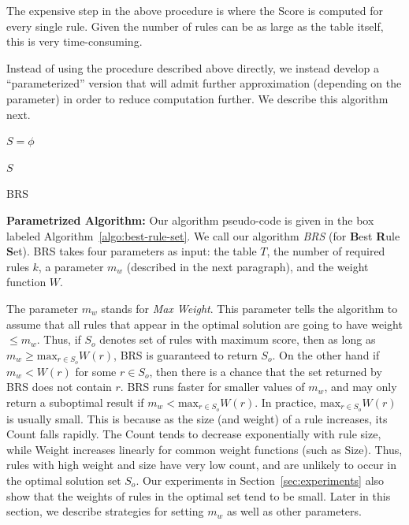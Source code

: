 \documentclass[10pt,journal,compsoc]{IEEEtran}
\newcommand{\stitle}[1]{\vspace{0.5em}\noindent\textbf{#1}}
\newcommand{\papertext}[1]{}
\newcommand{\techreporttext}[1]{#1}
\begin{document}
The expensive step in the above procedure is where the Score is computed for every
single rule. Given the number of rules can be as large as the table itself, this is very time-consuming.

Instead of using the procedure described above directly, we instead develop a ``parameterized'' version 
that will admit further approximation (depending on the parameter) in order to reduce computation further. We describe
this algorithm next.

\begin{algorithm}
\scriptsize
{}
$S = \phi$ 

\Return $S$
\caption{BRS\label{algo:best-rule-set}}
\end{algorithm}

\stitle{Parametrized Algorithm:} Our algorithm pseudo-code is given in the box labeled Algorithm~\ref{algo:best-rule-set}. We call our algorithm {\em BRS} (for \textbf{B}est \textbf{R}ule \textbf{S}et). BRS takes four parameters as input: the table $T$, the number of required rules $k$, a parameter $m_w$ (described in the next paragraph), and the weight function $W$. 

The parameter $m_w$ stands for \textit{Max Weight}. This parameter tells the algorithm to assume that all rules that appear in the optimal solution are going to have weight $\leq m_w$. Thus, if $S_o$ denotes set of rules with maximum score, then as long as $m_w \geq \textrm{max}_{r \in S_o}W(r)$, BRS is guaranteed to return $S_o$. On the other hand if $m_w < W(r)$ for some $r \in S_o$, then there is a chance that the set returned by BRS does not contain $r$. BRS runs faster for smaller values of $m_w$, and may only return a suboptimal result if $m_w < \textrm{max}_{r \in S_o}W(r)$. In practice, $\textrm{max}_{r \in S_o}W(r)$ is usually small. This is because as the size (and weight) of a rule increases, its Count falls rapidly. The Count tends to decrease exponentially with rule size, while Weight increases linearly for common weight functions (such as Size). Thus, rules with high weight and size have very low count, and are unlikely to occur in the optimal solution set $S_o$. Our experiments in Section~\ref{sec:experiments} also show that the weights of rules in the optimal set tend to be small. \papertext{In the technical report~\cite{DBLP:journals/pvldb/JoglekarGP15}, we describe strategies for setting $k$, $m_w$ and other parameters.} \techreporttext{Later in this section, we describe strategies for setting $m_w$ as well as other parameters.}
\end{document}
